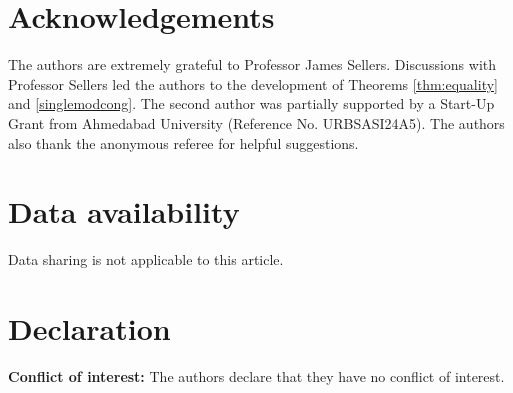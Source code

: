 \documentclass[12pt,reqno]{amsart}
\numberwithin{equation}{section}
\begin{document}
\section*{Acknowledgements}

The authors are extremely grateful to Professor James Sellers. Discussions with Professor Sellers led the authors to the  development of Theorems \ref{thm:equality} and \ref{singlemodcong}. The second author was partially supported by a Start-Up Grant from Ahmedabad University (Reference No. URBSASI24A5). The authors also thank the anonymous referee for helpful suggestions.

\section*{Data availability}
Data sharing is not applicable to this article.

\section*{Declaration}
\textbf{Conflict of interest:} The authors declare that they have no conflict of interest.
\end{document}
